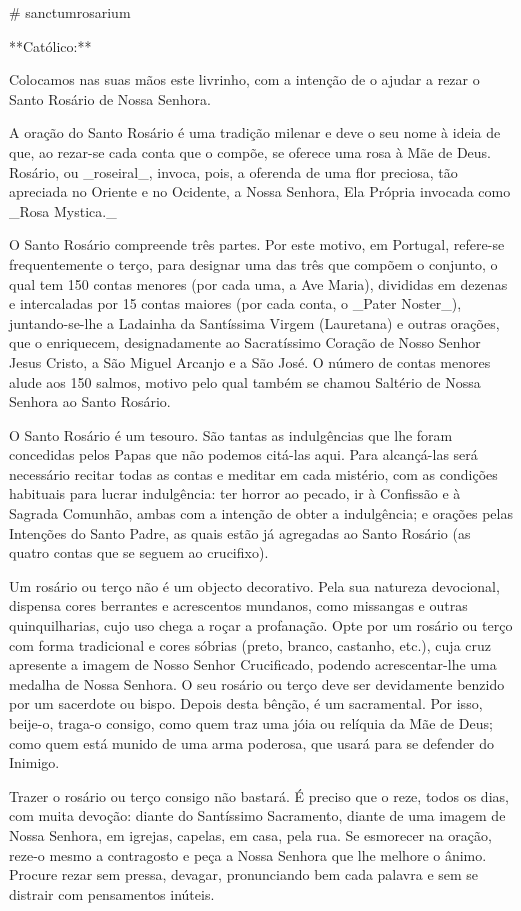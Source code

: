 # sanctumrosarium

**Católico:**

Colocamos nas suas mãos este livrinho, com a intenção de o ajudar a rezar o Santo Rosário de Nossa Senhora.

A oração do Santo Rosário é uma tradição milenar e deve o seu nome à ideia de que, ao rezar-se cada conta que o compõe, se oferece uma rosa à Mãe de Deus. Rosário, ou _roseiral_, invoca, pois, a oferenda de uma flor preciosa, tão apreciada no Oriente e no Ocidente, a Nossa Senhora, Ela Própria invocada como _Rosa Mystica._

O Santo Rosário compreende três partes. Por este motivo, em Portugal, refere-se frequentemente o terço, para designar uma das três que compõem o conjunto, o qual tem 150 contas menores (por cada uma, a Ave Maria), divididas em dezenas e intercaladas por 15 contas maiores (por cada conta, o _Pater Noster_), juntando-se-lhe a Ladainha da Santíssima Virgem (Lauretana) e outras orações, que o enriquecem, designadamente ao Sacratíssimo Coração de Nosso Senhor Jesus Cristo, a São Miguel Arcanjo e a São José. O número de contas menores alude aos 150 salmos, motivo pelo qual também se chamou Saltério de Nossa Senhora ao Santo Rosário.

O Santo Rosário é um tesouro. São tantas as indulgências que lhe foram concedidas pelos Papas que não podemos citá-las aqui. Para alcançá-las será necessário recitar todas as contas e meditar em cada mistério, com as condições habituais para lucrar indulgência: ter horror ao pecado, ir à Confissão e à Sagrada Comunhão, ambas com a intenção de obter a indulgência; e orações pelas Intenções do Santo Padre, as quais estão já agregadas ao Santo Rosário (as quatro contas que se seguem ao crucifixo).

Um rosário ou terço não é um objecto decorativo. Pela sua natureza devocional, dispensa cores berrantes e acrescentos mundanos, como missangas e outras quinquilharias, cujo uso chega a roçar a profanação. Opte por um rosário ou terço com forma tradicional e cores sóbrias (preto, branco, castanho, etc.), cuja cruz apresente a imagem de Nosso Senhor Crucificado, podendo acrescentar-lhe uma medalha de Nossa Senhora. O seu rosário ou terço deve ser devidamente benzido por um sacerdote ou bispo. Depois desta bênção, é um sacramental. Por isso, beije-o, traga-o consigo, como quem traz uma jóia ou relíquia da Mãe de Deus; como quem está munido de uma arma poderosa, que usará para se defender do Inimigo.

Trazer o rosário ou terço consigo não bastará. É preciso que o reze, todos os dias, com muita devoção: diante do Santíssimo Sacramento, diante de uma imagem de Nossa Senhora, em igrejas, capelas, em casa, pela rua. Se esmorecer na oração, reze-o mesmo a contragosto e peça a Nossa Senhora que lhe melhore o ânimo. Procure rezar sem pressa, devagar, pronunciando bem cada palavra e sem se distrair com pensamentos inúteis.

